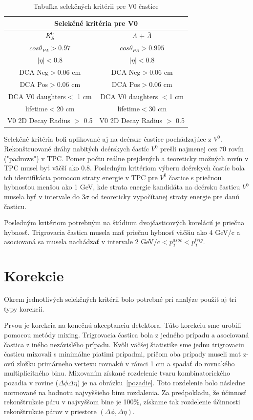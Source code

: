 \documentclass[thesismargins, thesislinespacing]{rnthesis}
\begin{document}
\begin{table}[hbtp!]
	\begin{center}
		\begin{tabular}{|c|c|}
			\hline
			 \multicolumn{2}{|c|}{Selekčné kritéria pre V0}  \\ \hline
			$K^0_S$ & $\Lambda$ + $\bar{\Lambda}$ \\ \hline
			$cos\theta_{PA} >0.97$ & $cos\theta_{PA} >0.995$  \\ \hline
			$|\eta|<0.8$ & $|\eta|<0.8$   \\ \hline
			DCA Neg$>$0.06 cm & DCA Neg$>$0.06 cm \\ \hline
			DCA Pos$>$0.06 cm & DCA Pos$>$0.06 cm \\ \hline
			DCA V0 daughters$<$ 1 cm & DCA V0 daughters $<$1 cm \\ \hline
			lifetime$<$20 cm & lifetime$<$30 cm \\ \hline
			V0 2D Decay Radius $>$ 0.5 & V0 2D Decay Radius $>$ 0.5\\ 
			\hline
		\end{tabular}
		\caption{Tabuľka selekčných kritérii pre V0 častice}
		\label{tabulka}
	\end{center}
\end{table}
\newpage
Selekčné kritéria boli aplikované aj na dcérske častice pochádzajúce z $V^0$. Rekonštruované dráhy nabitých dcérskych častíc $V^0$ prešli najmenej cez 70 rovín ("padrows") v TPC. Pomer počtu reálne prejdených a teoreticky možných rovín v TPC musel byť väčší ako 0.8. Posledným kritériom výberu dcérskych častíc bola ich identifikácia pomocou straty energie v TPC pre $V^0$ častice s priečnou hybnosťou menšou ako 1 GeV, kde strata energie kandidáta na dcérsku časticu $V^0$ musela byť v intervale do $3\sigma$ od teoreticky vypočítanej straty energie pre danú časticu.

Posledným kritériom potrebným na štúdium dvojčasticových korelácií je priečna hybnosť. Trigrovacia častica musela mať priečnu hybnosť väčšiu ako 4 GeV/c a asociovaná sa musela nachádzať v intervale 2 GeV/c$<p_T^{asoc}<p_T^{trig}$.

\section{Korekcie}
Okrem jednotlivých selekčných kritérii bolo potrebné pri analýze použiť aj tri typy korekcií. 

Prvou je korekcia na konečnú akceptanciu detektora. Túto korekciu sme urobili pomocou metódy mixing. Trigrovacia častica bola z jedného prípadu a asociovaná častica z iného nezávislého prípadu. Kvôli väčšej štatistike sme jednu trigrovaciu časticu mixovali s minimálne piatimi prípadmi, pričom oba prípady museli mať z-ovú zložku primárneho vertexu rovnakú v rámci 1 cm a spadať do rovnakého multiplicitného binu. Mixovaním získané rozdelenie tvaru kombinatorického pozadia v rovine ($\Delta \phi \Delta \eta$) je na obrázku~\ref{pozadie}. Toto rozdelenie bolo následne normované na hodnotu najvyššieho binu rozdalenia. Za predpokladu, že účinnosť rekonštrukcie páru v najvyššom bine je 100\%, získame tak rozdelenie účinnosti rekonštrukcie párov v priestore $(\Delta \phi,\Delta\eta)$.
\end{document}
